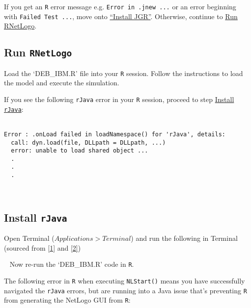 \documentclass[10,portrait]{article}
\newenvironment{Shaded}{\begin{snugshade}}{\end{snugshade}}
\newcommand{\FunctionTok}[1]{\textcolor[rgb]{0.00,0.00,0.00}{#1}}
\newcommand{\VariableTok}[1]{\textcolor[rgb]{0.00,0.00,0.00}{#1}}
\newcommand{\ExtensionTok}[1]{#1}
\newcommand{\NormalTok}[1]{#1}
\begin{document}
If you get an \texttt{R} error message e.g.
\texttt{Error\ in\ .jnew\ ...} or an error beginning with
\texttt{Failed\ Test\ ...}, move onto
\protect\hyperlink{install-jgr}{``Install JGR''}. Otherwise, continue to
\protect\hyperlink{run-rnetlogo}{Run RNetLogo}.

\hypertarget{run-rnetlogo}{\subsection{\texorpdfstring{Run
\texttt{RNetLogo}}{Run RNetLogo}}\label{run-rnetlogo}}

Load the `DEB\_IBM.R' file into your \texttt{R} session. Follow the
instructions to load the model and execute the simulation.

If you see the following \texttt{rJava} error in your \texttt{R}
session, proceed to step \protect\hyperlink{install-rjava}{Install
\texttt{rJava}}:\\
\hspace*{0.333em} ~

\begin{verbatim}
Error : .onLoad failed in loadNamespace() for 'rJava', details:
  call: dyn.load(file, DLLpath = DLLpath, ...)
  error: unable to load shared object ...
  .  
  .  
  .  
\end{verbatim}

~ ~

\hypertarget{install-rjava}{\subsection{\texorpdfstring{Install
\texttt{rJava}}{Install rJava}}\label{install-rjava}}

Open Terminal (\(Applications > Terminal\)) and run the following in
Terminal (sourced from \protect\hyperlink{references}{{[}1{]}} and
\protect\hyperlink{references}{{[}2{]}}) ~

\begin{Shaded}
\end{Shaded}

~ Now re-run the `DEB\_IBM.R' code in \texttt{R}.

The following error in \texttt{R} when executing \texttt{NLStart()}
means you have successfully navigated the \texttt{rJava} errors, but are
running into a Java issue that's preventing \texttt{R} from generating
the NetLogo GUI from \texttt{R}: ~ ~
\end{document}
